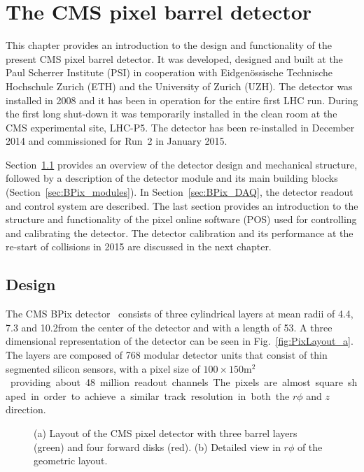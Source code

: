 \chapter{The CMS pixel barrel detector}
\label{ch:BPix}

This chapter provides an introduction to the design and functionality of the present CMS pixel barrel detector.
It was developed, designed and built at the Paul Scherrer Institute (PSI) in cooperation with Eidgen{\"o}ssische Technische Hochschule Zurich (ETH) and the University of Zurich (UZH).
The detector was installed in 2008 and it has been in operation for the entire first LHC run.
During the first long shut-down it was temporarily installed in the clean room at the CMS experimental site, LHC-P5.
The detector has been re-installed in December 2014 and commissioned for Run~2 in January 2015.

Section~\ref{sec:BPix_design} provides an overview of the detector design and mechanical structure, followed by a description of the detector module and its main building blocks (Section~\ref{sec:BPix_modules}).
In Section~\ref{sec:BPix_DAQ}, the detector readout and control system are described.
The last section provides an introduction to the structure and functionality of the pixel online software (POS) used for controlling and calibrating the detector.
The detector calibration and its performance at the re-start of collisions in 2015 are discussed in the next chapter.

\section{Design}\label{sec:BPix_design}

The CMS BPix detector~\cite{Kastli2007724} consists of three cylindrical layers at mean radii of 4.4, 7.3 and 10.2\cm from the center of the detector and with a length of 53\cm.
A three dimensional representation of the detector can be seen in Fig.~\ref{fig:PixLayout_a}.
The layers are composed of 768 modular detector units that consist of thin segmented silicon sensors, with a pixel size of $100\times150$\unit{m$^2$} providing about 48 million readout channels.
The pixels are almost square shaped in order to achieve a similar track resolution in both the $r\phi$ and $z$ direction.

\begin{figure}[!htb]
 \begin{center}
 \end{center}
 \caption{(a) Layout of the CMS pixel detector with three barrel layers (green) and four forward disks (red). (b) Detailed view in $r\phi$ of the geometric layout.}
 \label{fig:PixLayout}
\end{figure}

